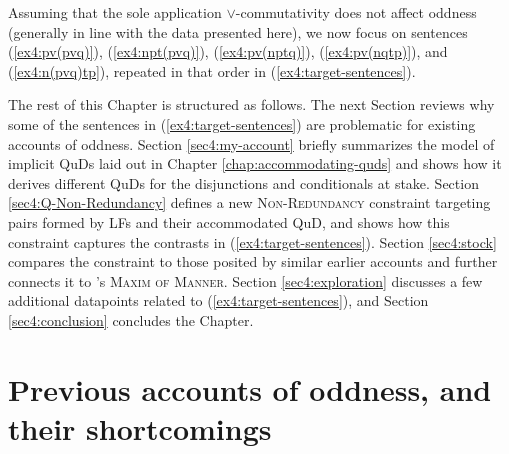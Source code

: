 Assuming that the sole application $\vee$-commutativity does not affect oddness (generally in line with the data presented here), we now focus on sentences (\ref{ex4:pv(pvq)}), (\ref{ex4:npt(pvq)}), (\ref{ex4:pv(nptq)}), (\ref{ex4:pv(nqtp)}), and (\ref{ex4:n(pvq)tp}), repeated in that order in (\ref{ex4:target-sentences}).
\begin{exe}
	\ex \label{ex4:target-sentences}
	\begin{xlist}
		\label{ex4:pv(pvq)-repeated}
		\label{ex4:npt(pvq)-repeated}
		\label{ex4:pv(nptq)-repeated}
		\label{ex4:pv(nqtp)-repeated}
		\label{ex4:n(pvq)tp-repeated}
	\end{xlist}
\end{exe}


The rest of this Chapter is structured as follows. The next Section reviews why some of the sentences in (\ref{ex4:target-sentences}) are problematic for existing accounts of oddness. Section \ref{sec4:my-account} briefly summarizes the model of implicit QuDs laid out in Chapter \ref{chap:accommodating-quds} and shows how it derives different QuDs for the disjunctions and conditionals at stake. Section \ref{sec4:Q-Non-Redundancy} defines a new \textsc{Non-Redundancy} constraint targeting pairs formed by LFs and their accommodated QuD, and shows how this constraint captures the contrasts in (\ref{ex4:target-sentences}). Section \ref{sec4:stock} compares the constraint to those posited by similar earlier accounts and further connects it to \citeauthor{Grice1975}'s  \textsc{Maxim of Manner}.
Section \ref{sec4:exploration} discusses a few additional datapoints related to (\ref{ex4:target-sentences}), and Section \ref{sec4:conclusion} concludes the Chapter.

\section{Previous accounts of oddness, and their shortcomings}\label{sec4:previous-accounts}

